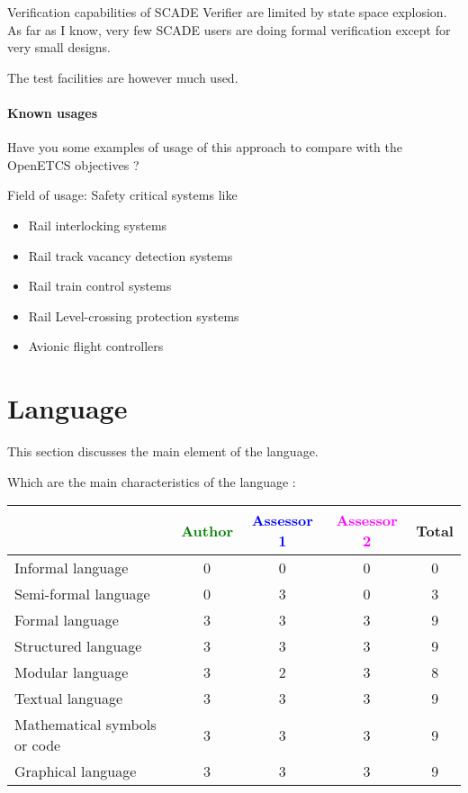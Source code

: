 \begin{assessor1}
Verification capabilities of SCADE Verifier are limited by state space
explosion. As far as I know, very few SCADE users are doing formal
verification except for very small designs.

The test facilities are however much used.
\end{assessor1}


\paragraph{Known usages} Have you some examples of usage of this approach to  compare with the OpenETCS objectives ?

Field of usage: Safety critical systems like
\begin{itemize}
	\item Rail interlocking systems
	\item Rail track vacancy detection systems
	\item Rail train control systems
	\item Rail Level-crossing protection systems
	\item Avionic flight controllers
\end{itemize}

\section{Language}
This section discusses the main element of the language.

Which are the main characteristics of the language :

\begin{tabular}{|l | c | c | c | c|}
\hline
& \textcolor{green}{Author} & \textcolor{blue}{Assessor 1} & \textcolor{magenta}{Assessor 2} & Total \\
\hline 
Informal language &  0  & 0 &0 &  0 \\
\hline 
Semi-formal language &  0  & 3 &0 &  3 \\
\hline
Formal language &  3  & 3 &3 &  9 \\
\hline
Structured language &  3  & 3 &3 & 9 \\
\hline
Modular language &  3  & 2 &3 & 8 \\
\hline
Textual language & 3 & 3 &3 & 9 \\
\hline
Mathematical symbols or code & 3 & 3 &3 & 9 \\
\hline
Graphical language & 3 & 3 &3 & 9 \\
\hline
\end{tabular}

